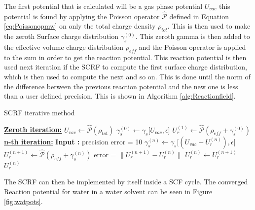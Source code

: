\documentclass[..Thesis.tex]{subfiles}
\begin{document}
The first potential that is calculated will be a gas phase potential $U_{vac}$ this
potential is found by applying the Poisson operator $\hat{\mathscr{P}}$ defined
in Equation \ref{eq:Poissonopmw} on only the total charge density $\rho_{tot}$.
This is then used to make the zeroth Surface charge distribution $\gamma_s^{(0)}$.
This zeroth gamma is then added to the effective volume charge distribution $\rho_{eff}$
and the Poisson operator is applied to the sum in order to get the reaction potential.
This reaction potential is then used next iteration if the \ac{SCRF} to compute
the first surface charge distribution, which is then used to compute the next
and so on. This is done until the norm of the difference between the previous
reaction potential and the new one is less than a user defined precision. This is shown in
Algorithm \ref{alg:Reactionfield}.
\begin{algorithm}
  \caption{\ac{SCRF} iterative method}\label{alg:Reactionfield}
  \begin{algorithmic}
    \STATE \underline{\textbf{Zeroth iteration:}}
    \STATE $U_{vac} \leftarrow \hat{\mathscr{P}}(\rho_{tot})$
    \STATE $\gamma_s^{(0)} \leftarrow \gamma_s\big[U_{vac}, \epsilon\big]$
    \STATE $U_r^{(1)} \leftarrow \hat{\mathscr{P}}(\rho_{eff} + \gamma_s^{(0)})$
    \STATE \underline{\textbf{n-th iteration:}}
    \STATE \textbf{Input :} precision
    \STATE error = 10
      \STATE $\gamma_s^{(n)} \leftarrow \gamma_s\big[(U_{vac}+ U_r^{(n)}), \epsilon\big]$
      \STATE $U_r^{(n+1)} \leftarrow \hat{\mathscr{P}} (\rho_{eff} + \gamma_s^{(n)})$
      \STATE error = $\lVert U_r^{(n+1)} - U_r^{(n)} \rVert$
      \STATE $U_r^{(n)} \leftarrow U_r^{(n+1)}$
    \ENDWHILE
    \RETURN $U_r^{(n)}$
  \end{algorithmic}
\end{algorithm}
The \ac{SCRF} can then be implemented by itself inside a \ac{SCF} cycle.
The converged Reaction potential for water in a water solvent can be seen in
Figure \ref{fig:watpots}.
\end{document}
